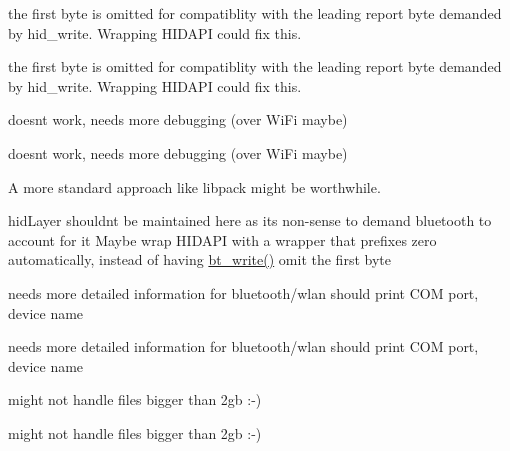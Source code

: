 \begin{DoxyRefList}
\item[\label{bug__bug000009}%
\hypertarget{bug__bug000009}{}%
global\+Scope$>$ Global \hyperlink{btwin_8c_a4da84bfe7c552c082e73af8f28ff2af5}{bt\+\_\+write} (void $\ast$handle, const u8 $\ast$buf, size\+\_\+t count)]the first byte is omitted for compatiblity with the leading report byte demanded by {\ttfamily hid\+\_\+write}. Wrapping H\+I\+D\+A\+P\+I could fix this.  
\item[\label{bug__bug000005}%
\hypertarget{bug__bug000005}{}%
global\+Scope$>$ Global \hyperlink{btunix_8c_acbb62c11a110c097a4a9be010af9c4e7}{bt\+\_\+write} (void $\ast$fd\+\_\+, const u8 $\ast$buf, size\+\_\+t count)]the first byte is omitted for compatiblity with the leading report byte demanded by {\ttfamily hid\+\_\+write}. Wrapping H\+I\+D\+A\+P\+I could fix this.  
\item[\label{bug__bug000013}%
\hypertarget{bug__bug000013}{}%
global\+Scope$>$ Global \hyperlink{getfilec_8c_ad364f2729481e25215bedbe7904dee6e}{dl} (const char $\ast$path, F\+I\+L\+E $\ast$fp)]doesn\textquotesingle{}t work, needs more debugging (over Wi\+Fi maybe)  
\item[\label{bug__bug000013}%
\hypertarget{bug__bug000013}{}%
global\+Scope$>$ Global \hyperlink{getfilec_8c_ad364f2729481e25215bedbe7904dee6e}{dl} (const char $\ast$path, F\+I\+L\+E $\ast$fp)]doesn\textquotesingle{}t work, needs more debugging (over Wi\+Fi maybe)  
\item[\label{bug__bug000014}%
\hypertarget{bug__bug000014}{}%
File \hyperlink{packets_8h}{packets.h} ]A more standard approach like libpack might be worthwhile.  
\item[\label{bug__bug000015}%
\hypertarget{bug__bug000015}{}%
global\+Scope$>$ Global \hyperlink{packets_8h_abe208177340b58cb5096daabe07922d1}{P\+R\+E\+F\+I\+X\+\_\+\+S\+I\+Z\+E} ]hid\+Layer shouldn\textquotesingle{}t be maintained here as it\textquotesingle{}s non-\/sense to demand bluetooth to account for it Maybe wrap H\+I\+D\+A\+P\+I with a wrapper that prefixes zero automatically, instead of having \hyperlink{btserial_8h_ac9b25cd932b8c5a842d1cd96e22fd200}{bt\+\_\+write()} omit the first byte  
\item[\label{bug__bug000016}%
\hypertarget{bug__bug000016}{}%
global\+Scope$>$ Global \hyperlink{test_8c_ac8da963855e09bf929c085486f4a3b47}{test} ()]needs more detailed information for bluetooth/wlan should print C\+O\+M port, device name  
\item[\label{bug__bug000016}%
\hypertarget{bug__bug000016}{}%
global\+Scope$>$ Global \hyperlink{test_8c_ac8da963855e09bf929c085486f4a3b47}{test} ()]needs more detailed information for bluetooth/wlan should print C\+O\+M port, device name  
\item[\label{bug__bug000017}%
\hypertarget{bug__bug000017}{}%
global\+Scope$>$ Global \hyperlink{up_8c_a01133633b700f5000c647deccfac9e3e}{up} (F\+I\+L\+E $\ast$fp, const char $\ast$dst)]might not handle files bigger than 2gb \+:-\/)  
\item[\label{bug__bug000017}%
\hypertarget{bug__bug000017}{}%
global\+Scope$>$ Global \hyperlink{up_8c_a01133633b700f5000c647deccfac9e3e}{up} (F\+I\+L\+E $\ast$fp, const char $\ast$dst)]might not handle files bigger than 2gb \+:-\/) 
\end{DoxyRefList}